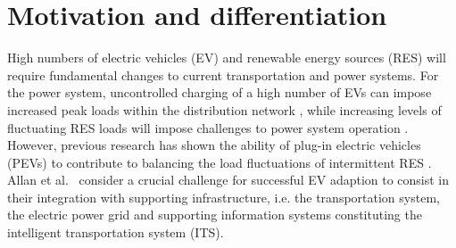 \section{Motivation and differentiation}



High numbers of electric vehicles (EV) and renewable energy sources (RES) will require fundamental changes to current transportation and power systems. 
For the power system, uncontrolled charging of a high number of EVs can impose increased peak loads within the distribution network \cite{lopes2009identifying}, while increasing levels of fluctuating RES loads will impose challenges to power system operation \cite{heussen2012unified}. 
However, previous research has shown the ability of plug-in electric vehicles (PEVs) to contribute to balancing the load fluctuations of intermittent RES \cite{dallinger2012grid}. 
Allan et al.~\cite{allan2015benchmark} consider a crucial challenge for successful EV adaption to consist in their integration with supporting infrastructure, i.e. the transportation system, the electric power grid and supporting information systems constituting the intelligent transportation system (ITS). 

